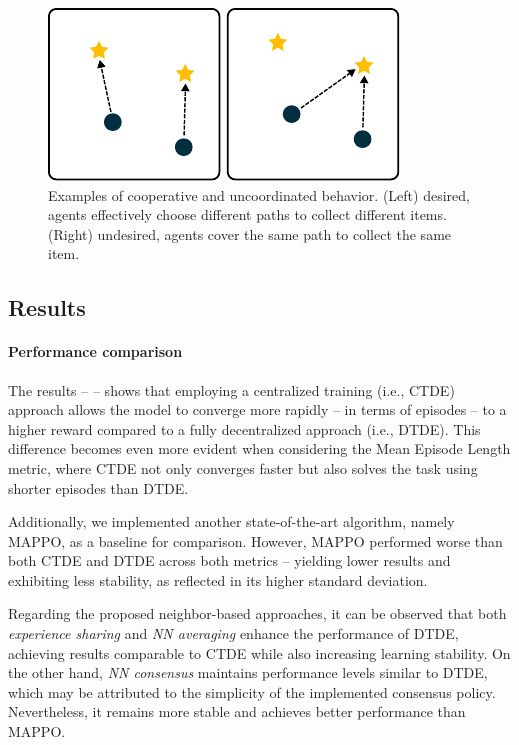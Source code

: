 \documentclass[sigconf]{acmart}
\begin{document}
\begin{figure}
  \centering
  \includegraphics[width=1\linewidth]{figures/behavior.pdf}
  \caption{Examples of cooperative and uncoordinated behavior. (Left) desired, agents effectively choose different paths to collect different items. (Right) undesired, agents cover the same path to collect the same item.}
  \label{fig:behavior}
\end{figure}


\subsection{Results}\label{sec:results}

\paragraph{Performance comparison}
The results --  -- shows that employing a centralized training (i.e., CTDE) approach allows the model to converge 
 more rapidly -- in terms of episodes -- to a higher reward compared to a fully decentralized approach (i.e., DTDE). 
%
This difference becomes even more evident when considering the Mean Episode Length metric, where CTDE not only converges 
 faster but also solves the task using shorter episodes than DTDE. 
 
Additionally, we implemented another state-of-the-art algorithm, namely MAPPO, as a baseline for comparison. 
%
However, MAPPO performed worse than both CTDE and DTDE across both metrics -- yielding lower results and exhibiting less stability, 
 as reflected in its higher standard deviation.

Regarding the proposed neighbor-based approaches, it can be observed that both \emph{experience sharing} and 
 \emph{NN averaging} enhance the performance of DTDE, achieving results comparable to CTDE while also increasing 
 learning stability. 
% 
On the other hand, \emph{NN consensus} maintains performance levels similar to DTDE, which may be attributed to the 
 simplicity of the implemented consensus policy. 
%
Nevertheless, it remains more stable and achieves better performance than MAPPO.
\end{document}
